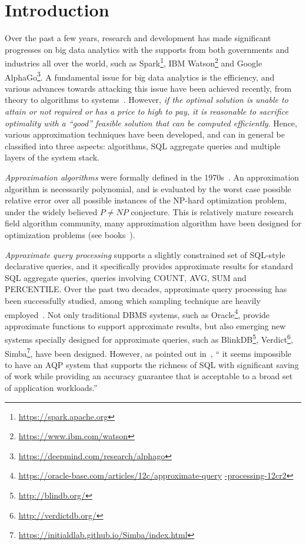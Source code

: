 \section{Introduction}
\label{sec-intro}


Over the past a few years, research and development has made significant progresses on big data analytics with the supports from both governments and industries all over the world, such as Spark\footnote{\small \url{https://spark.apache.org}}, IBM Watson\footnote{\small \url{https://www.ibm.com/watson}} and Google AlphaGo\footnote{\small \url{https://deepmind.com/research/alphago}}. A fundamental issue for big data analytics is the efficiency, and various advances towards attacking this issue have been achieved recently, from theory to algorithms to systems~\cite{FanGN13,Jordan15,ZahariaXWDADMRV16}. However, {\em if the optimal solution is unable to attain or not required or has a price to high to pay, it is reasonable to sacrifice optimality with a ``good'' feasible solution that can be computed efficiently}. Hence, various approximation techniques have been developed, and can in general be classified into three aspects: algorithms, SQL aggregate queries and multiple layers of the system stack.

\bi
\item[(1)] {\em Approximation algorithms} were formally defined in the 1970s~\cite{GareyGU72,Johnson74a}. An approximation algorithm is necessarily polynomial, and is evaluated by the worst case possible relative error over all possible instances of the  NP-hard optimization problem, under the widely believed $P\ne NP$ conjecture. This is relatively mature research field algorithm community, many approximation algorithm have been designed for optimization problems (see books~\cite{Dorit96,approx03,Ausiello99}).
\item[(2)] {\em Approximate query processing} supports a slightly constrained set of SQL-style declarative queries, and it specifically provides approximate results for standard SQL aggregate queries, \eg queries involving COUNT, AVG, SUM and PERCENTILE. Over the past two decades, approximate query processing has been successfully studied, among which sampling technique are heavily employed~\cite{ChaudhuriDK17,Mozafari17,Kraska17,GarofalakisG01}. Not only traditional DBMS systems, such as Oracle\footnote{\small \url{https://oracle-base.com/articles/12c/approximate-query} \url{-processing-12cr2}},  provide approximate functions to support approximate results, but also emerging new systems specially designed for approximate queries, such as BlinkDB\footnote{\small \url{http://blindb.org/}}, Verdict\footnote{\small \url{http://verdictdb.org/}}, Simba\footnote{\small \url{https://initialdlab.github.io/Simba/index.html}}, have been designed. However, as pointed out in~\cite{ChaudhuriDK17}, `` it seems impossible to have an AQP system that supports the richness of SQL with significant saving of work while providing an accuracy guarantee that is acceptable to a broad set of application workloads.''

